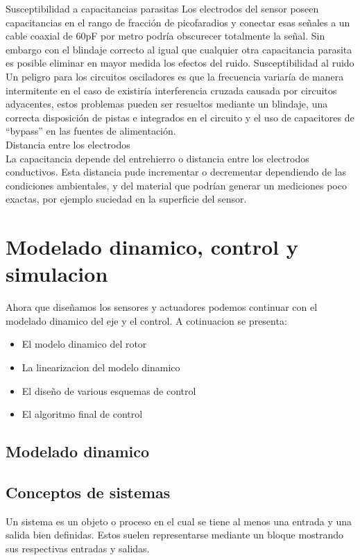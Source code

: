 Susceptibilidad a capacitancias parasitas
Los electrodos del sensor poseen capacitancias en el rango de fracción de picofaradios y conectar esas señales a un cable coaxial de 60pF por metro podría obscurecer totalmente la señal. Sin embargo con el blindaje correcto al igual que cualquier otra capacitancia parasita es posible eliminar en mayor medida los efectos  del ruido.
Susceptibilidad al ruido\\
Un peligro para los circuitos osciladores  es que la frecuencia variaría de manera intermitente en el caso de existiría interferencia cruzada causada por circuitos adyacentes, estos problemas pueden ser resueltos mediante un blindaje, una correcta disposición de pistas e integrados en el circuito y el  uso de capacitores de “bypass” en las fuentes de alimentación.\\
Distancia entre los electrodos\\
La capacitancia depende del entrehierro o distancia entre los electrodos conductivos. Esta distancia pude incrementar o decrementar dependiendo de las condiciones ambientales, y del material que podrían generar un mediciones poco exactas, por ejemplo suciedad en la superficie del sensor.



\section{Modelado dinamico, control y simulacion}

Ahora que diseñamos los sensores y actuadores podemos continuar con el modelado dinamico del eje y el control.
A cotinuacion se presenta:
\begin{itemize}
\item El modelo dinamico del rotor
\item La linearizacion del modelo dinamico
\item El diseño de various esquemas de control
\item El algoritmo final de control
\end{itemize}


\subsection{Modelado dinamico}
\subsection{Conceptos de sistemas}
Un sistema es un objeto o proceso en el cual se tiene al menos una entrada y una salida bien definidas. Estos suelen representarse mediante un bloque mostrando sus respectivas entradas y salidas.  

